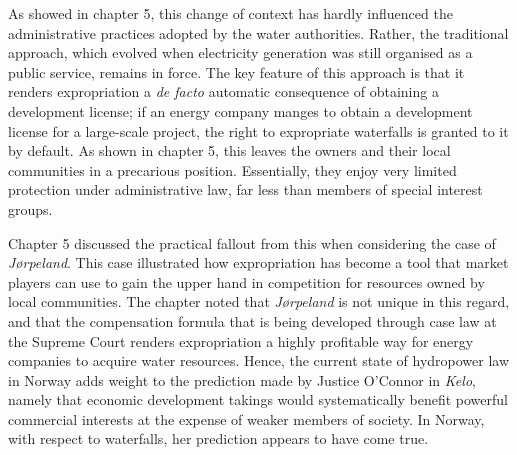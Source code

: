 As showed in chapter 5, this change of context has hardly influenced the administrative practices adopted by the water authorities. Rather, the traditional approach, which evolved when electricity generation was still organised as a public service, remains in force. The key feature of this approach is that it renders expropriation a {\it de facto} automatic consequence of obtaining a development license; if an energy company manges to obtain a development license for a large-scale project, the right to expropriate waterfalls is granted to it by default. As shown in chapter 5, this leaves the owners and their local communities in a precarious position. Essentially, they enjoy very limited protection under administrative law, far less than members of special interest groups.


Chapter 5 discussed the practical fallout from this when considering the case of {\it Jørpeland}. This case illustrated how expropriation has become a tool that market players can use to gain the upper hand in competition for resources owned by local communities. The chapter noted that {\it Jørpeland} is not unique in this regard, and that the compensation formula that is being developed through case law at the Supreme Court renders expropriation a highly profitable way for energy companies to acquire water resources. Hence, the current state of hydropower law in Norway adds weight to the prediction made by Justice O'Connor in {\it Kelo}, namely that economic development takings would systematically benefit powerful commercial interests at the expense of weaker members of society. In Norway, with respect to waterfalls, her prediction appears to have come true.



